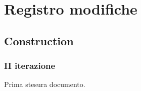 \documentclass[10pt]{softeng} %
\begin{document}
\startofdocument{}





\section{Registro modifiche}

\subsection{Construction}

\subsubsection{II iterazione}

Prima stesura documento.


\printcustombib{}

\end{document}
